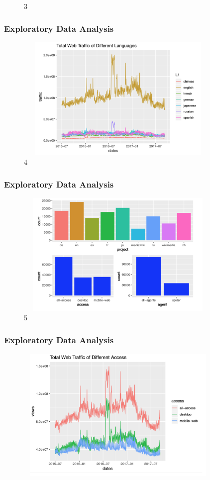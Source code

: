 \documentclass[cjk,10pt]{beamer}
\begin{document}
\begin{CJK*}{GBK}{song}
\begin{frame}
\begin{figure}[htbp]
\caption{3}
\end{figure}
       \end{frame} 
        \begin{frame}
        \frametitle{Exploratory Data Analysis}
    \begin{figure}[htbp]
\centering
\includegraphics[height=6cm, width=10cm]{4}
\caption{4}
\end{figure}
       \end{frame}
        \begin{frame}
        \frametitle{Exploratory Data Analysis}
    \begin{figure}[htbp]
\centering
\includegraphics[height=6cm, width=10cm]{5}
\caption{5}
\end{figure}
       \end{frame}
           \begin{frame}
        \frametitle{Exploratory Data Analysis}
    \begin{figure}[htbp]
\centering
\includegraphics[height=6.5cm, width=10cm]{6}

\end{figure}
\end{frame}
\end{CJK*}
\end{document}
